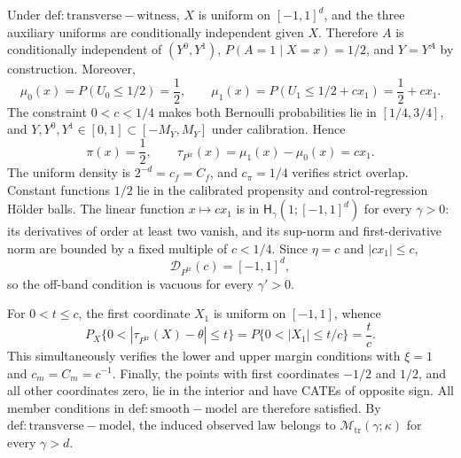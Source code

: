 Under \(\mathrm{def:transverse-witness}\), \(X\) is uniform on \([-1,1]^d\), and the three auxiliary uniforms are conditionally independent given \(X\). Therefore \(A\) is conditionally independent of \((Y^0,Y^1)\), \(P(A=1\mid X=x)=1/2\), and \(Y=Y^A\) by construction. Moreover,
\[
\mu_0(x)=P(U_0\le 1/2)=\frac12,
\qquad
\mu_1(x)=P(U_1\le 1/2+cx_1)=\frac12+cx_1.
\]
The constraint \(0<c<1/4\) makes both Bernoulli probabilities lie in \([1/4,3/4]\), and \(Y,Y^0,Y^1\in[0,1]\subset[-M_Y,M_Y]\) under calibration. Hence
\[
\pi(x)=\frac12,\qquad \tau_{P^{\mathrm{tr}}}(x)=\mu_1(x)-\mu_0(x)=cx_1.
\]
The uniform density is \(2^{-d}=c_f=C_f\), and \(c_\pi=1/4\) verifies strict overlap. Constant functions \(1/2\) lie in the calibrated propensity and control-regression Hölder balls. The linear function \(x\mapsto cx_1\) is in \(\mathsf H_\gamma(1;[-1,1]^d)\) for every \(\gamma>0\): its derivatives of order at least two vanish, and its sup-norm and first-derivative norm are bounded by a fixed multiple of \(c<1/4\). Since \(\eta=c\) and \(|cx_1|\le c\),
\[
\mathcal D_{P^{\mathrm{tr}}}(c)=[-1,1]^d,
\]
so the off-band condition is vacuous for every \(\gamma'>0\).

For \(0<t\le c\), the first coordinate \(X_1\) is uniform on \([-1,1]\), whence
\[
P_X\{0<|\tau_{P^{\mathrm{tr}}}(X)-\theta|\le t\}
=P\{0<|X_1|\le t/c\}=\frac{t}{c}.
\]
This simultaneously verifies the lower and upper margin conditions with \(\xi=1\) and \(c_m=C_m=c^{-1}\). Finally, the points with first coordinates \(-1/2\) and \(1/2\), and all other coordinates zero, lie in the interior and have CATEs of opposite sign. All member conditions in \(\mathrm{def:smooth-model}\) are therefore satisfied. By \(\mathrm{def:transverse-model}\), the induced observed law belongs to \(\mathcal M_{\mathrm{tr}}(\gamma;\kappa)\) for every \(\gamma>d\).